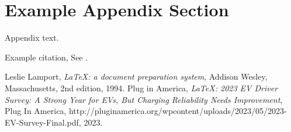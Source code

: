 \documentclass[preprint,12pt]{elsarticle}
\begin{document}
\appendix
\section{Example Appendix Section}
\label{app1}

Appendix text.

Example citation, See \citet{lamport94}.




\begin{thebibliography}{00}


  Leslie Lamport,
  \textit{\LaTeX: a document preparation system},
  Addison Wesley, Massachusetts,
  2nd edition,
  1994.
    Plug in America,
    \textit{\LaTeX: 2023 EV Driver Survey: A Strong Year for EVs, But Charging Reliability Needs Improvement},
    Plug In America,
    http://pluginamerica.org/wpcontent/uploads/2023/05/2023-EV-Survey-Final.pdf,
    2023.
\end{thebibliography}
\end{document}
